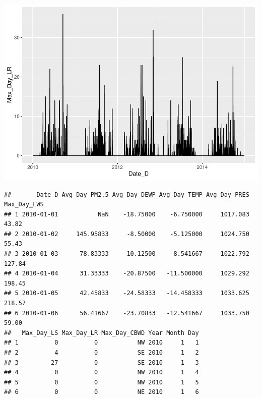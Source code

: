 \documentclass[
]{article}
\begin{document}
\includegraphics{Final_Project_1_files/figure-latex/unnamed-chunk-2-8.pdf}

\begin{verbatim}
##       Date_D Avg_Day_PM2.5 Avg_Day_DEWP Avg_Day_TEMP Avg_Day_PRES Max_Day_LWS
## 1 2010-01-01           NaN    -18.75000    -6.750000     1017.083       43.82
## 2 2010-01-02     145.95833     -8.50000    -5.125000     1024.750       55.43
## 3 2010-01-03      78.83333    -10.12500    -8.541667     1022.792      127.84
## 4 2010-01-04      31.33333    -20.87500   -11.500000     1029.292      198.45
## 5 2010-01-05      42.45833    -24.58333   -14.458333     1033.625      218.57
## 6 2010-01-06      56.41667    -23.70833   -12.541667     1033.750       59.00
##   Max_Day_LS Max_Day_LR Max_Day_CBWD Year Month Day
## 1          0          0           NW 2010     1   1
## 2          4          0           SE 2010     1   2
## 3         27          0           SE 2010     1   3
## 4          0          0           NW 2010     1   4
## 5          0          0           NW 2010     1   5
## 6          0          0           NE 2010     1   6
\end{verbatim}
\end{document}
